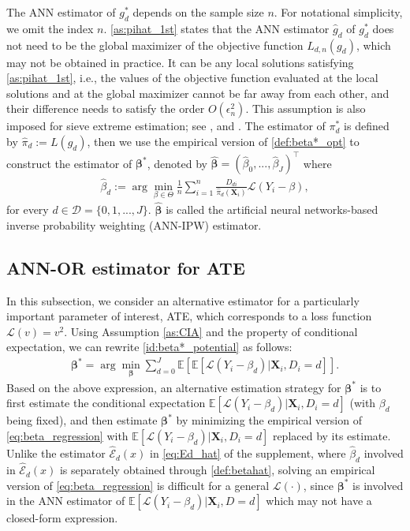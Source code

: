 \documentclass[11pt]{article}
\numberwithin{equation}{section}
\begin{document}
The ANN estimator of  $g^*_d$ depends on the sample size $n$. For notational simplicity, we omit the index $n$. \eqref{as:pihat_1st} states that the ANN estimator $\widehat{g}_{d}$ of $g^* _{d}$ does not need to be the global maximizer of the objective function $L_{d,n}(g_{d})$, which may not be obtained in practice. It can be any local solutions satisfying  \eqref{as:pihat_1st}, i.e., the values of the objective function evaluated at the local solutions and at the global maximizer cannot be far away from each other, and their difference needs to satisfy the order $O(\epsilon _{n}^{2})$. This assumption is also imposed for sieve extreme estimation; see \cite{shen1997methods}, \cite{chen1998sieve} and \cite{chen1999improved}. The estimator of $\pi_d^*$ is defined by $\widehat{\pi}_d:=L(\widehat{g}_d)$,  then we use the empirical version of \eqref{def:beta*_opt} to construct the estimator of $\boldsymbol{\beta }^{\ast }$, denoted by $\widehat{\boldsymbol{\beta}}=(\widehat{\beta}_{0},...,\widehat{\beta}_{J})^\top$ where
\begin{align}\label{def:betahat}
	\widehat{\beta}_d:= \arg\min_{\beta\in\Theta}\frac{1}{n}\sum_{i=1}^n\frac{D_{di}}{\widehat{\pi}_d(\boldsymbol{X}_{i})}\mathcal{L}\left(Y_i-{\beta}\right),
\end{align}
for every $d\in \mathcal{D}=\{0,1,...,J\}$. $\widehat{\boldsymbol{\beta}}$ is called the artificial neural networks-based inverse probability weighting (ANN-IPW) estimator.

\subsection{ANN-OR estimator for ATE}\label{sec:OR-ATE}
In this subsection, we consider an alternative estimator for a particularly  important parameter of interest, ATE, which corresponds to a loss function $\mathcal{L}(v)=v^2$. Using Assumption \ref{as:CIA} and the property of conditional expectation, we can rewrite \eqref{id:beta*_potential} as follows:
\begin{align}
	\label{eq:beta_regression}
	\boldsymbol{\beta}^*=\arg\min_{\boldsymbol{\beta}}\sum_{d=0}^J \mathbb{E}\left[ \mathbb{E}[\mathcal{L}(Y_i-\beta_d)|\boldsymbol{X}_{i},D_i=d]\right].
\end{align}
Based on the above expression, an alternative estimation strategy for $\boldsymbol{\beta}^*$ is to first estimate the conditional expectation $ \mathbb{E}[\mathcal{L}(Y_i-\beta_d)|\boldsymbol{X}_{i},D_i=d]$ (with $\beta_d$ being fixed), and then estimate $\boldsymbol{\beta}^*$ by minimizing the empirical version of \eqref{eq:beta_regression} with $ \mathbb{E}[\mathcal{L}(Y_i-\beta_d)|\boldsymbol{X}_{i},D_i=d]$ replaced by its estimate. Unlike the estimator $\widehat{\mathcal{E}}_d(x)$ in \eqref{eq:Ed_hat} of the supplement, where $\widehat{\beta}_d$ involved in $\widehat{\mathcal{E}}_d(x)$ is separately obtained through \eqref{def:betahat}, solving an empirical version of \eqref{eq:beta_regression} is difficult for a general $\mathcal{L}(\cdot)$, since  $\boldsymbol{\beta}^*$ is involved in the ANN estimator of $\mathbb{E}[\mathcal{L}(Y_i-\beta_d)|\boldsymbol{X}_{i},D=d]$ which may not have a closed-form expression.
\end{document}
